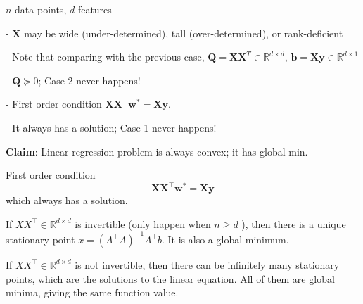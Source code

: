 \documentclass[11pt,a4paper]{article}
\begin{document}
$n$ data points, $d$ features

- $\mathbf{X}$ may be wide (under-determined), tall (over-determined), or rank-deficient

- Note that comparing with the previous case, $\mathbf{Q}=\mathbf{X X}^{T} \in \mathbb{R}^{d \times d}$, $\mathbf{b}=\mathbf{X} \mathbf{y} \in \mathbb{R}^{d \times 1}$

- $\mathbf{Q} \succeq 0$; Case 2 never happens!

- First order condition $\mathbf{X X}^{\top} \mathbf{w}^{*}=\mathbf{X} \mathbf{y}$.

\quad - It always has a solution; Case 1 never happens!

\textbf{Claim}: Linear regression problem is always convex; it has global-min.

First order condition
$$
\mathbf{X X}^{\top} \mathbf{w}^{*}=\mathbf{X} \mathbf{y}
$$
which always has a solution.

If $X X^{\top} \in \mathbb{R}^{d \times d}$ is invertible (only happen when $n \geq d$ ), then there is a unique stationary point $x=\left(A^{\top} A\right)^{-1} A^{\top} b$. It is also a global minimum.

If $X X^{\top} \in \mathbb{R}^{d \times d}$ is not invertible, then there can be infinitely many stationary points, which are the solutions to the linear equation.
All of them are global minima, giving the same function value.
\end{document}
